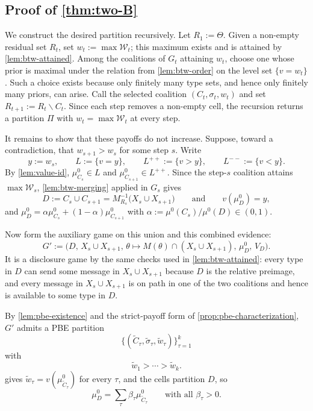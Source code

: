 \documentclass[11pt]{article}
\newcommand{\W}{\mathcal{W}}
\begin{document}
\subsection*{Proof of \cref{thm:two-B}}
We construct the desired partition recursively. Let $R_1:=\Theta$. Given a non-empty residual set $R_t$, set $w_t:=\max\W_t$; this maximum exists and is attained by \cref{lem:btw-attained}. Among the coalitions of $G_t$ attaining $w_t$, choose one whose prior is maximal under the relation from \cref{lem:btw-order} on the level set $\{v=w_t\}$. Such a choice exists because only finitely many type sets, and hence only finitely many priors, can arise. Call the selected coalition $(C_t,\sigma_t,w_t)$ and set $R_{t+1}:=R_t\smallsetminus C_t$. Since each step removes a non-empty cell, the recursion returns a partition $\Pi$ with $w_t=\max\W_t$ at every step.

It remains to show that these payoffs do not increase. Suppose, toward a contradiction, that $w_{s+1}>w_s$ for some step $s$. Write
\[
    y:=w_s,\qquad
    L:=\{v=y\},\qquad
    L^{++}:=\{v>y\},\qquad
    L^{--}:=\{v<y\}.
\]
By \cref{lem:value-id}, $\mu^0_{C_s}\in L$ and $\mu^0_{C_{s+1}}\in L^{++}$. Since the step-$s$ coalition attains $\max\W_s$, \cref{lem:btw-merging} applied in $G_s$ gives
\[
    D:=C_s\cup C_{s+1}=M^{-1}_{R_s}\bigl(X_s\cup X_{s+1}\bigr)
    \qquad\text{and}\qquad
    v(\mu^0_D)=y,
\]
and $\mu^0_D=\alpha\mu^0_{C_s}+(1-\alpha)\mu^0_{C_{s+1}}$ with $\alpha:=\mu^0(C_s)/\mu^0(D)\in(0,1)$.

Now form the auxiliary game on this union and this combined evidence:
\[
    G'
    :=
    \bigl(D,\,
    X_s\cup X_{s+1},\,
    \theta\mapsto M(\theta)\cap(X_s\cup X_{s+1}),\,
    \mu^0_D,\,
    V_D\bigr).
\]
It is a disclosure game by the same checks used in \cref{lem:btw-attained}: every type in $D$ can send some message in $X_s\cup X_{s+1}$ because $D$ is the relative preimage, and every message in $X_s\cup X_{s+1}$ is on path in one of the two coalitions and hence is available to some type in $D$.

By \cref{lem:pbe-existence} and the strict-payoff form of \cref{prop:pbe-characterization}, $G'$ admits a PBE partition
\[
    \{(\widetilde C_\tau,\widetilde\sigma_\tau,\widetilde w_\tau)\}_{\tau=1}^k
\]
with
\[
    \widetilde w_1>\cdots>\widetilde w_k .
\]
 gives $\widetilde w_\tau=v(\mu^0_{\widetilde C_\tau})$ for every $\tau$, and the cells partition $D$, so
\[
    \mu^0_D=\sum_\tau\beta_\tau\mu^0_{\widetilde C_\tau}
    \qquad\text{with all }\beta_\tau>0.
\]
\end{document}
